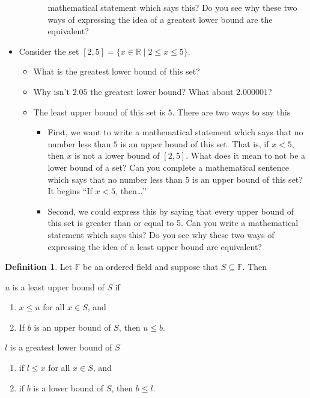 \documentclass[11pt]{article}
\newenvironment{task}
	{\begin{mdframed}[linecolor=lightgray, linewidth=3pt]\raggedright}
	{\end{mdframed}}
\theoremstyle{definition}
\newtheorem{definition}[theorem]{Definition}
\begin{document}
\begin{task}
\begin{itemize}
\begin{itemize}
\begin{itemize}
          mathematical statement which says this? Do you see why these two ways of expressing the idea of a greatest lower bound are
          the equivalent?
        \end{itemize}
    \end{itemize}
    \item Consider the set $[2,5]=\{ x\in\mathbb{R} \mid 2 \leq x \leq 5 \}$. 
      \begin{itemize}
        \item What is the greatest lower bound of this set? 
        \item Why isn't $2.05$ the greatest lower bound? What about $2.000001$?
        \item The least upper bound of this set is $5$. There are two ways to say this
          \begin{itemize}
            \item First, we want to write a mathematical statement which says that no number less than
          $5$ is an upper bound of this set.  That is, if $x < 5$, then $x$ is not a lower bound of $[2,5]$. What does it mean to not be
          a lower bound of a set? Can you complete a mathematical sentence which says that no number less than $5$ is an upper bound of
          this set? It begins ``If $x < 5$, then\dots''
          \item Second, we could express this by saying that every upper bound of this set is greater than or equal to 5. Can you
            write a mathematical statement which says this? Do you see why these two ways of expressing the idea of a least upper bound
            are equivalent?
          \end{itemize}
      \end{itemize}
  \end{itemize}
\end{task}

\begin{definition}
  Let $\mathbb{F}$ be an ordered field and suppose that $S\subseteq \mathbb{F}$. Then
    \item $u$ is a least upper bound of $S$ if 
      \begin{enumerate}
        \item $x \leq u$ for all $x\in S$, and
        \item If $b$ is an upper bound of $S$, then $u\leq b$. 
      \end{enumerate}
    \item $l$ is a greatest lower bound of $S$ 
      \begin{enumerate}
        \item if $l \leq x$ for all $x\in S$, and
        \item if $b$ is a lower bound of $S$, then $b \leq l$.
      \end{enumerate}
\end{definition}
\end{document}
